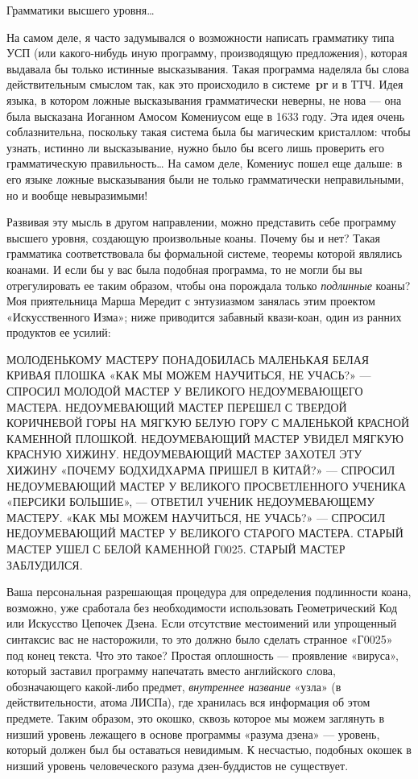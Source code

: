 \documentclass[../main.tex]{subfiles}
\begin{document}
Грамматики высшего уровня\ldots{}

На самом деле, я часто задумывался о возможности написать грамматику типа УСП (или какого-нибудь иную программу, производящую предложения), которая выдавала бы только истинные высказывания. Такая программа наделяла бы слова действительным смыслом так, как это происходило в системе~\textbf{pr} и в ТТЧ. Идея языка, в котором ложные высказывания грамматически неверны, не нова --- она была высказана Иоганном Амосом Комениусом еще в 1633 году. Эта идея очень соблазнительна, поскольку такая система была бы магическим кристаллом: чтобы узнать, истинно ли высказывание, нужно было бы всего лишь проверить его грамматическую правильность\ldots{} На самом деле, Комениус пошел еще дальше: в его языке ложные высказывания были не только грамматически неправильными, но и вообще невыразимыми!

Развивая эту мысль в другом направлении, можно представить себе программу высшего уровня, создающую произвольные коаны. Почему бы и нет? Такая грамматика соответствовала бы формальной системе, теоремы которой являлись коанами. И если бы у вас была подобная программа, то не могли бы вы отрегулировать ее таким образом, чтобы она порождала только \emph{подлинные} коаны? Моя приятельница Марша Мередит с энтузиазмом занялась этим проектом «Искусственного Изма»; ниже приводится забавный квази-коан, один из ранних продуктов ее усилий:

МОЛОДЕНЬКОМУ МАСТЕРУ ПОНАДОБИЛАСЬ МАЛЕНЬКАЯ БЕЛАЯ КРИВАЯ ПЛОШКА «КАК МЫ МОЖЕМ НАУЧИТЬСЯ, НЕ УЧАСЬ?» --- СПРОСИЛ МОЛОДОЙ МАСТЕР У ВЕЛИКОГО НЕДОУМЕВАЮЩЕГО МАСТЕРА. НЕДОУМЕВАЮЩИЙ МАСТЕР ПЕРЕШЕЛ С ТВЕРДОЙ КОРИЧНЕВОЙ ГОРЫ НА МЯГКУЮ БЕЛУЮ ГОРУ С МАЛЕНЬКОЙ КРАСНОЙ КАМЕННОЙ ПЛОШКОЙ. НЕДОУМЕВАЮЩИЙ МАСТЕР УВИДЕЛ МЯГКУЮ КРАСНУЮ ХИЖИНУ. НЕДОУМЕВАЮЩИЙ МАСТЕР ЗАХОТЕЛ ЭТУ ХИЖИНУ «ПОЧЕМУ БОДХИДХАРМА ПРИШЕЛ В КИТАЙ?» --- СПРОСИЛ НЕДОУМЕВАЮЩИЙ МАСТЕР У ВЕЛИКОГО ПРОСВЕТЛЕННОГО УЧЕНИКА «ПЕРСИКИ БОЛЬШИЕ», --- ОТВЕТИЛ УЧЕНИК НЕДОУМЕВАЮЩЕМУ МАСТЕРУ. «КАК МЫ МОЖЕМ НАУЧИТЬСЯ, НЕ УЧАСЬ?» --- СПРОСИЛ НЕДОУМЕВАЮЩИЙ МАСТЕР У ВЕЛИКОГО СТАРОГО МАСТЕРА. СТАРЫЙ МАСТЕР УШЕЛ С БЕЛОЙ КАМЕННОЙ Г0025. СТАРЫЙ МАСТЕР ЗАБЛУДИЛСЯ.

Ваша персональная разрешающая процедура для определения подлинности коана, возможно, уже сработала без необходимости использовать Геометрический Код или Искусство Цепочек Дзена. Если отсутствие местоимений или упрощенный синтаксис вас не насторожили, то это должно было сделать странное «Г0025» под конец текста. Что это такое? Простая оплошность --- проявление «вируса», который заставил программу напечатать вместо английского слова, обозначающего какой-либо предмет, \emph{внутреннее название} «узла» (в действительности, атома ЛИСПа), где хранилась вся информация об этом предмете. Таким образом, это окошко, сквозь которое мы можем заглянуть в низший уровень лежащего в основе программы «разума дзена» --- уровень, который должен был бы оставаться невидимым. К несчастью, подобных окошек в низший уровень человеческого разума дзен-буддистов не существует.
\end{document}
